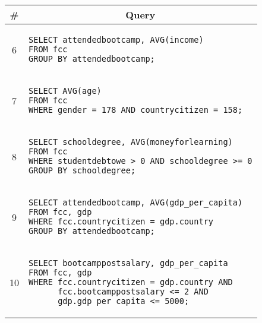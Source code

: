 \begin{tabular}{cl}
\toprule
\# & \multicolumn{1}{c}{Query} \\
\midrule
6 & 
\begin{minipage}{6in}
\begin{lstlisting}[breaklines]
SELECT attendedbootcamp, AVG(income)
FROM fcc
GROUP BY attendedbootcamp;
\end{lstlisting}
\end{minipage}{queryno} \label{q6} \\
7 & 
\begin{minipage}{6in}
\begin{lstlisting}[breaklines]
SELECT AVG(age)
FROM fcc
WHERE gender = 178 AND countrycitizen = 158;
\end{lstlisting}
\end{minipage}{queryno} \label{q7} \\
8 & 
\begin{minipage}{6in}
\begin{lstlisting}[breaklines]
SELECT schooldegree, AVG(moneyforlearning)
FROM fcc
WHERE studentdebtowe > 0 AND schooldegree >= 0
GROUP BY schooldegree;
\end{lstlisting}
\end{minipage}{queryno} \label{q8}\\
9 & 
\begin{minipage}{6in}
\begin{lstlisting}[breaklines]
SELECT attendedbootcamp, AVG(gdp_per_capita)
FROM fcc, gdp
WHERE fcc.countrycitizen = gdp.country
GROUP BY attendedbootcamp;
\end{lstlisting}
\end{minipage}{queryno} \label{q9}\\
10 & 
\begin{minipage}{6in}
\begin{lstlisting}[breaklines]
SELECT bootcamppostsalary, gdp_per_capita
FROM fcc, gdp
WHERE fcc.countrycitizen = gdp.country AND
      fcc.bootcamppostsalary <= 2 AND
      gdp.gdp_per_capita <= 5000;
\end{lstlisting}
\end{minipage}{queryno} \label{q10}\\
\bottomrule
\end{tabular}
